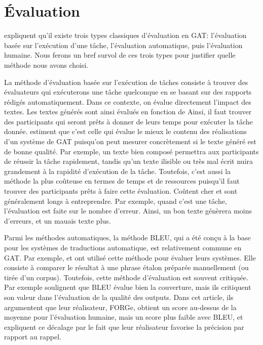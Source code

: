 
\chapter{Évaluation}\label{ch:eval}

\cite{ReiterInvestigationValidityMetrics2009} expliquent qu'il existe trois types classiques d'évaluation en \ac{GAT}: l'évaluation basée sur l'exécution d'une tâche, l'évaluation automatique, puis l'évaluation humaine. Nous ferons un bref survol de ces trois types pour justifier quelle méthode nous avons choisi.

La méthode d'évaluation basée sur l'exécution de tâches consiste à trouver des évaluateurs qui exécuterons une tâche quelconque en se basant sur des rapports rédigés automatiquement. Dans ce contexte, on évalue directement l'impact des textes.  Les textes générés sont ainsi évalués en fonction de  Ainsi, il faut trouver des participants qui seront prêts à donner de leurs temps pour exécuter la tâche donnée. \cite{ReiterInvestigationValidityMetrics2009} estiment que c'est celle qui évalue le mieux le contenu des réalisations d'un système de \ac{GAT} puisqu'on peut mesurer concrètement si le texte généré est de bonne qualité. Par exemple, un texte bien composé permettra aux participants de réussir la tâche rapidement, tandis qu'un texte ilisible ou très mal écrit nuira grandement à la rapidité d'exécution de la tâche. Toutefois, c'est aussi la méthode la plus coûteuse en termes de temps et de ressources puisqu'il faut trouver des participants prêts à faire cette évaluation. Coûtent cher et sont généralement longs à entreprendre. Par exemple, quand c'est une tâche, l'évaluation est faite sur le nombre d'erreur. Ainsi, un bon texte génèrera moins d'erreurs, et un mauais texte plus.

Parmi les méthodes automatiques, la méthode BLEU, qui a été conçu à la base pour les systèmes de traductions automatique, est relativement commune en \ac{GAT}. Par exemple, \cite{Langkilde-gearyForestbasedstatisticalsentence2000} et \cite{Habash2003MatadorAL} ont utilisé cette méthode pour évaluer leurs systèmes. Elle consiste à comparer le résultat à une phrase étalon préparée manuellement (ou tirée d'un corpus). Toutefois, cette méthode d'évaluation est souvent critiquée. Par exemple \cite{DBLP:conf/semeval/MilleCBW17} soulignent que BLEU évalue bien la couverture, mais ils critiquent son valeur dans l'évaluation de la qualité des outputs. Dans cet article, ils argumentent que leur réalisateur, FORGe, obtient un score au-dessus de la moyenne pour l'évaluation humaine, mais un score plus faible avec BLEU, et expliquent ce décalage par le fait que leur réalisateur favorise la précision par rapport au rappel.

